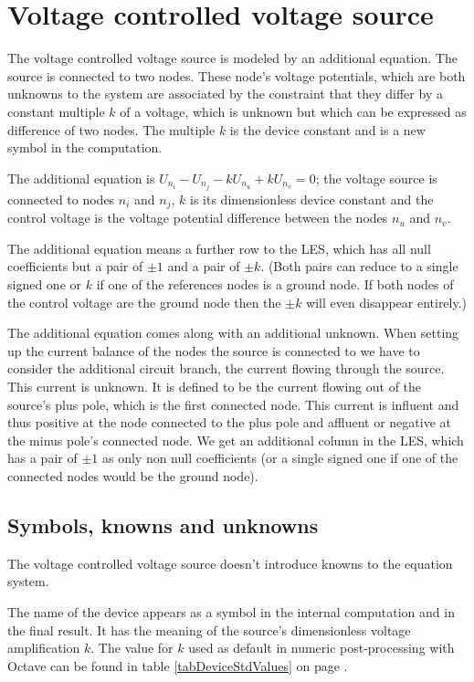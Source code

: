 \section{Voltage controlled voltage source}

The voltage controlled voltage source is modeled by an additional
equation. The source is connected to two nodes. These node's voltage
potentials, which are both unknowns to the system are associated by the
constraint that they differ by a constant multiple $k$ of a voltage, which
is unknown but which can be expressed as difference of two nodes. The
multiple $k$ is the device constant and is a new symbol in the
computation.

The additional equation is $U_{n_i} - U_{n_j} - kU_{n_u} + kU_{n_v} = 0$;
the voltage source is connected to nodes $n_i$ and $n_j$, $k$ is its
dimensionless device constant and the control voltage is the voltage
potential difference between the nodes $n_u$ and $n_v$.
 
The additional equation means a further row to the LES, which has all null
coefficients but a pair of $\pm 1$ and a pair of $\pm k$. (Both pairs can
reduce to a single signed one or $k$ if one of the references nodes is a
ground node. If both nodes of the control voltage are the ground node then
the $\pm k$ will even disappear entirely.)

The additional equation comes along with an additional unknown. When
setting up the current balance of the nodes the source is connected to we
have to consider the additional circuit branch, the current flowing
through the source. This current is unknown. It is defined to be the
current flowing out of the source's plus pole, which is the first
connected node. This current is influent and thus positive at the node
connected to the plus pole and affluent or negative at the minus pole's
connected node. We get an additional column in the LES, which has a pair
of $\pm 1$ as only non null coefficients (or a single signed one if one of
the connected nodes would be the ground node).


\subsection{Symbols, knowns and unknowns}

The voltage controlled voltage source doesn't introduce knowns to the
equation system.

The name of the device appears as a symbol in the internal computation and
in the final result. It has the meaning of the source's dimensionless
voltage amplification $k$. The value for $k$ used as default in numeric
post-processing with Octave can be found in table \ref{tabDeviceStdValues}
on page \pageref{tabDeviceStdValues}.

